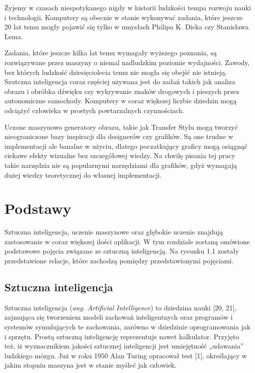 \documentclass[openright]{xmgr}
\begin{document}
\introduction

\indent \indent Żyjemy w czasach niespotykanego nigdy w historii ludzkości tempa rozwoju nauki i technologii. Komputery są obecnie w stanie wykonywać zadania, które jeszcze 20 lat temu mogły pojawić się tylko w umysłach Philipa K. Dicka czy Stanisława Lema.

Zadania, które jeszcze kilka lat temu wymagały wyższego poznania, są rozwiązywane przez maszyny o niemal nadludzkim poziomie wydajności. Zawody, bez których ludzkość dziesięciolecia temu nie mogła się obejść nie istnieją. Szutczna inteligencja coraz częściej używana jest do zadań takich jak analiza obrazu i obróbka dźwięku czy wykrywanie znaków drogowych i pieszych przez autonomiczne samochody. Komputery w coraz większej liczbie dziedzin mogą odciążyć człowieka w prostych powtarzalnych czynnościach.

 Uczone maszynowo generatory obrazu, takie jak Transfer Stylu mogą tworzyć nieograniczone bazy inspiracji dla designerów czy grafików. Są one trudne w implementacji ale banalne w użyciu, dlatego poczatkujący graficy mogą osiągnąć ciekawe efekty wizualne bez szczegółowej wiedzy. Na chwilę pisania tej pracy takie narzędzia nie są popularnymi narzędziami dla grafików, gdyż wymagają dużej wiedzy teoretycznej do własnej implementacji. 


\chapter{Podstawy\label{s:dtd}}

\indent \indent Sztuczna inteligencja, uczenie maszynowe oraz głębokie uczenie znajdują zastosowanie w coraz większej ilości aplikacji. W tym rozdziale zostaną omówione podstawowe pojęcia związane ze sztuczną inteligencją. Na rysunku 1.1 zostały przedstawione relacje, które zachodzą pomiędzy przedstawionymi pojęciami.

\section{Sztuczna inteligencja}

\indent \indent Sztuczna inteligencja (\textit{ang. Artificial Intelligence}) to dziedzina nauki [20, 21], zajmująca się tworzeniem modeli zachowań inteligentnych oraz programów i systemów symulujących te zachowania, zarówno w dziedzinie oprogramowania jak i sprzętu. Prostą sztuczną inteligencję reprezentuje nawet kalkulator. Przyjęto też, iż wyznacznikiem jakości sztucznej inteligencji jest umiejętność „udawania” ludzkiego mózgu. Już w roku 1950 Alan Turing opracował test [1], określający w jakim stopniu maszyna jest w stanie myśleć jak człowiek.
\end{document}
